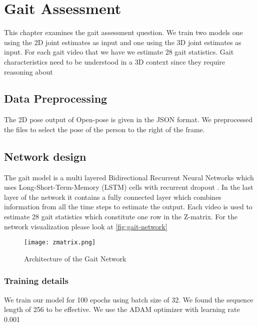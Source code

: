 
\chapter{Gait Assessment}\label{chapter:gait}

This chapter examines the gait assessment question. We train two models one using the 2D joint estimates as input and one using the 3D joint estimates as input. For each gait video that we have we estimate 28 gait statistics. Gait characteristics need to be understood in a 3D context since they require reasoning about

\section{Data Preprocessing}

The 2D pose output of Open-pose is given in the JSON format. We preprocessed the files to select the pose of the person to the right of the frame. 

\section{Network design}

The gait model is a multi layered Bidirectional Recurrent Neural Networks \parencite{schuster1997bidirectional} which uses Long-Short-Term-Memory (LSTM) \parencite{hochreiter1997long} cells with recurrent dropout \parencite{semeniuta2016recurrent}. In the last layer of the network it contains a fully connected layer which combines information from all the time steps to estimate the output. Each video is used to estimate 28 gait statistics which constitute one row in the Z-matrix. For the network visualization please look at \autoref{fig:gait-network}

\begin{figure}[htpb]
    \texttt{[image: zmatrix.png]}
    \caption{Architecture of the Gait Network}
    \label{fig:gait-network}
\end{figure}

\subsection{Training details}

We train our model for 100 epochs using batch size of 32. We found the sequence length of 256 to be effective. We use the ADAM optimizer with learning rate 0.001

